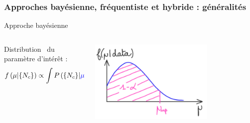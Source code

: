 \begin{frame}
\frametitle{Approches bayésienne, fréquentiste et hybride : généralités}
\begin{block}{Approche bayésienne}
\begin{columns}
\begin{column}{0.6\textwidth}
\begin{maliste}
\item Distribution \posterior~du paramètre d'intérêt :
\[f\left(\mu|\{N_{c}\}\right)\propto \displaystyle\int P\left(\{N_{c}\}|\textcolor{blue}{\mu},\textcolor{red}{\nu}\right)\underbrace{\pi_\nu\left(\nu\right)\pi_\mu\left(\mu\right)}_{priors}{\rm d}\textcolor{red}{\nu}\]
\end{maliste}
\end{column}
\begin{column}{0.4\textwidth}
\begin{center}
\vspace*{-0.3cm}
\includegraphics[width=0.7\textwidth]{Figures/Stat/posteriorIllustration.png}
\end{center}
\end{column}
\end{columns}
\end{block}



\end{frame}
